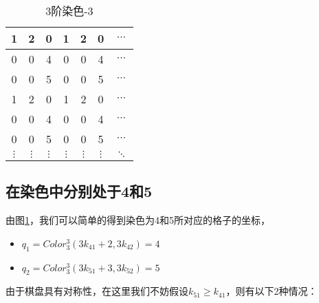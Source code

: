 \begin{table}[htbp]
	\centering
	\caption{3阶染色-3}
	\begin{tabular}{|c|c|c|c|c|c|c|}
		\hline
		1        & 2        & 0        & 1        & 2        & 0        & $\cdots$ \\
		\hline
		0        & 0        & 4        & 0        & 0        & 4        & $\cdots$ \\
		\hline
		0        & 0        & 5        & 0        & 0        & 5        & $\cdots$ \\
		\hline
		1        & 2        & 0        & 1        & 2        & 0        & $\cdots$ \\
		\hline
		0        & 0        & 4        & 0        & 0        & 4        & $\cdots$ \\
		\hline
		0        & 0        & 5        & 0        & 0        & 5        & $\cdots$ \\
		\hline
		$\vdots$ & $\vdots$ & $\vdots$ & $\vdots$ & $\vdots$ & $\vdots$ & $\ddots$ \\
		\hline
	\end{tabular}
	\label{fig:3-order-staining-last}
\end{table}

\subsection{在染色中分别处于4和5}

由图\ref{fig:3-order-staining-last}，我们可以简单的得到染色为4和5所对应的格子的坐标，

\begin{itemize}
	\item $q_1 = Color^3_3(3k_{41} + 2, 3k_{42}) = 4$
	\item $q_2 = Color^3_3(3k_{51} + 3, 3k_{52}) = 5$
\end{itemize}

由于棋盘具有对称性，在这里我们不妨假设$k_{51} \ge k_{41}$，则有以下2种情况：

